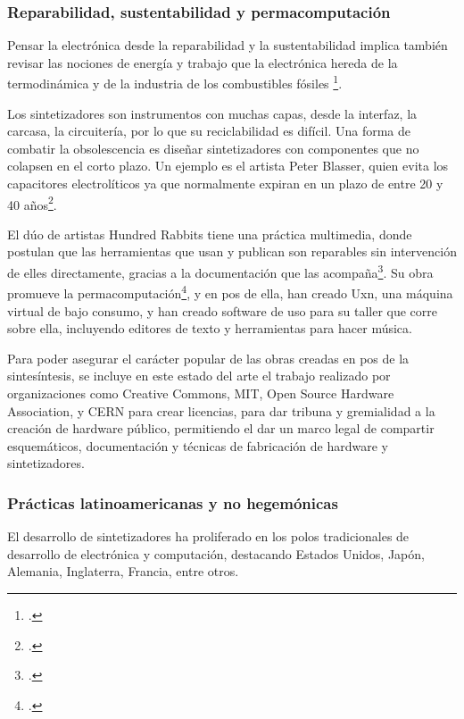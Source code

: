 \documentclass[../candidatura.tex]{subfiles}
\begin{document}
\subsubsection{Reparabilidad, sustentabilidad y permacomputación}

Pensar la electrónica desde la reparabilidad y la sustentabilidad implica también revisar las nociones de energía y trabajo que la electrónica hereda de la termodinámica y de la industria de los combustibles fósiles \footcite{daggett_birth_2019}.

Los sintetizadores son instrumentos con muchas capas, desde la interfaz, la carcasa, la circuitería, por lo que su reciclabilidad es difícil. Una forma de combatir la obsolescencia es diseñar sintetizadores con componentes que no colapsen en el corto plazo. Un ejemplo es el artista Peter Blasser, quien evita los capacitores electrolíticos ya que normalmente expiran en un plazo de entre 20 y 40 años\footcite{tagi_blasser_2023}.

El dúo de artistas Hundred Rabbits tiene una práctica multimedia, donde postulan que las herramientas que usan y publican son reparables sin intervención de elles directamente, gracias a la documentación que las acompaña\footcite{hundredrabbits_about_sinfecha}. Su obra promueve la permacomputación\footcite{hundredrabbits_permacomputing_sinfecha}, y en pos de ella, han creado Uxn, una máquina virtual de bajo consumo, y han creado software de uso para su taller que corre sobre ella, incluyendo editores de texto y herramientas para hacer música.

Para poder asegurar el carácter popular de las obras creadas en pos de la sintesíntesis, se incluye en este estado del arte el trabajo realizado por organizaciones como Creative Commons, MIT, Open Source Hardware Association, y CERN para crear licencias, para dar tribuna y gremialidad a la creación de hardware público, permitiendo el dar un marco legal de compartir esquemáticos, documentación y técnicas de fabricación de hardware y sintetizadores.

\subsubsection{Prácticas latinoamericanas y no hegemónicas}

El desarrollo de sintetizadores ha proliferado en los polos tradicionales de desarrollo de electrónica y computación, destacando Estados Unidos, Japón, Alemania, Inglaterra, Francia, entre otros.
\end{document}
